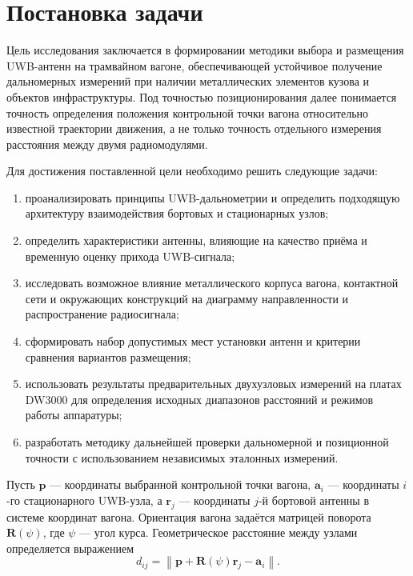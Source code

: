 \documentclass{misisarticle}
\begin{document}
\section{Постановка задачи}

Цель исследования заключается в формировании методики выбора и размещения UWB-антенн на трамвайном вагоне, обеспечивающей устойчивое получение дальномерных измерений при наличии металлических элементов кузова и объектов инфраструктуры. Под точностью позиционирования далее понимается точность определения положения контрольной точки вагона относительно известной траектории движения, а не только точность отдельного измерения расстояния между двумя радиомодулями.

Для достижения поставленной цели необходимо решить следующие задачи:
\begin{enumerate}
    \item проанализировать принципы UWB-дальнометрии и определить подходящую архитектуру взаимодействия бортовых и стационарных узлов;
    \item определить характеристики антенны, влияющие на качество приёма и временную оценку прихода UWB-сигнала;
    \item исследовать возможное влияние металлического корпуса вагона, контактной сети и окружающих конструкций на диаграмму направленности и распространение радиосигнала;
    \item сформировать набор допустимых мест установки антенн и критерии сравнения вариантов размещения;
    \item использовать результаты предварительных двухузловых измерений на платах DW3000 для определения исходных диапазонов расстояний и режимов работы аппаратуры;
    \item разработать методику дальнейшей проверки дальномерной и позиционной точности с использованием независимых эталонных измерений.
\end{enumerate}

Пусть \(\mathbf{p}\) — координаты выбранной контрольной точки вагона, \(\mathbf{a}_i\) — координаты \(i\)-го стационарного UWB-узла, а \(\mathbf{r}_j\) — координаты \(j\)-й бортовой антенны в системе координат вагона. Ориентация вагона задаётся матрицей поворота \(\mathbf{R}(\psi)\), где \(\psi\) — угол курса. Геометрическое расстояние между узлами определяется выражением
\begin{equation}
    d_{ij}=\left\|\mathbf{p}+\mathbf{R}(\psi)\mathbf{r}_j-\mathbf{a}_i\right\|.
\end{equation}
\end{document}
